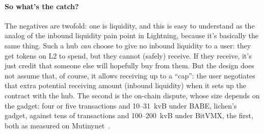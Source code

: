 \documentclass[11pt]{article}
\begin{document}
\paragraph{So what's the catch?} The negatives are twofold: one is liquidity, and this is easy to understand as the analog of the inbound liquidity pain point in Lightning, because it's basically the same thing. Such a hub \emph{can} choose to give no inbound liquidity to a user: they get tokens on L2 to spend, but they cannot (safely) receive. If they receive, it's just credit that someone else will hopefully buy from them. But the design does not assume that, of course, it allows receiving up to a ``cap'': the user negotiates that extra potential receiving amount (inbound liquidity) when it sets up the contract with the hub. The second is the on-chain dispute, whose size depends on the gadget: four or five transactions and 10--31~kvB under BABE, lichen's gadget, against tens of transactions and 100--200~kvB under BitVMX, the first, both as measured on Mutinynet~\cite{lichenbuilt,lichenbitvmx}.



\end{document}
